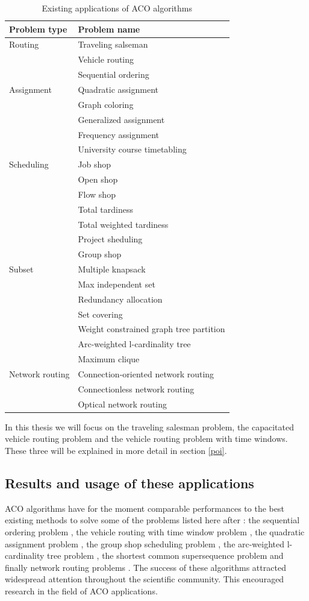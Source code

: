 \begin{table}
\centering
\begin{tabular}{|l|l|}
	\hline
	Problem type & Problem name\\
	\hline
	Routing & Traveling salseman \\
	&Vehicle routing \\
	&Sequential ordering \\[6pt]
	Assignment & Quadratic assignment \\
	&Graph coloring\\
	&Generalized assignment\\
	&Frequency assignment\\
	&University course timetabling\\[6pt]
	Scheduling & Job shop\\
	&Open shop\\
	&Flow shop \\
	&Total tardiness\\
	&Total weighted tardiness\\
	&Project sheduling\\
	&Group shop\\[6pt]
	Subset & Multiple knapsack\\
	&Max independent set\\
	&Redundancy allocation\\
	&Set covering\\
	&Weight constrained graph tree partition\\
	&Arc-weighted l-cardinality tree\\
	&Maximum clique\\[6pt]
	Network routing& Connection-oriented network routing\\
	&Connectionless network routing\\
	&Optical network routing\\
	\hline
\end{tabular}
\caption{Existing applications of ACO algorithms}
\label{tab:existing}
\end{table}

In this thesis we will focus on the traveling salesman problem, the capacitated vehicle routing problem and the vehicle routing problem with time windows. These three will be explained in more detail in section \ref{poi}.

\subsection{Results and usage of these applications}\label{results}
ACO algorithms have for the moment comparable performances to the best existing methods to solve some of the problems listed here after : the sequential ordering problem \cite{gambardella2000ant}, the vehicle routing with time window problem \cite{gambardella1999macs}, the quadratic assignment problem \cite{stutzle2000max}, the group shop scheduling problem \cite{blum2002aco}, the arc-weighted l-cardinality tree problem \cite{blum2005new}, the shortest common supersequence problem \cite{michel1999aco} and finally network routing problems \cite{varela1999ant}. The success of these algorithms attracted widespread attention throughout the scientific community. This encouraged research in the field of ACO applications.

